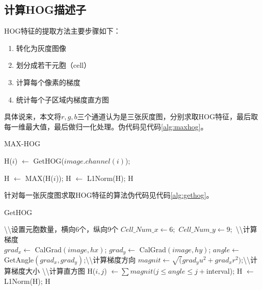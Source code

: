 \subsection{计算HOG描述子}
HOG特征的提取方法主要步骤如下：
\begin{enumerate}
  \item 转化为灰度图像
  \item 划分成若干元胞（cell）
  \item 计算每个像素的梯度
  \item 统计每个子区域内梯度直方图
\end{enumerate}

具体说来，本文将$r,g,b$三个通道认为是三张灰度图，分别求取HOG特征，最后取每一维最大值，最后做归一化处理。伪代码见代码\ref{alg:maxhog}。
\newcommand{\comment}{\textbackslash\textbackslash}
\begin{algorithm}
  \caption{MAX-HOG}\label{alg:maxhog}
  \begin{algorithmic}[1]

        \STATE H($i$) $\leftarrow$ GetHOG($image.channel(i)$);
    \ENDFOR

    \STATE  H $\leftarrow$ MAX(H($i$));
    \STATE  H $\leftarrow$ L1Norm(H);
    \RETURN H
  \end{algorithmic}
\end{algorithm}

针对每一张灰度图求取HOG特征的算法伪代码见代码\ref{alg:gethog}。

\begin{algorithm}
  \caption{GetHOG}\label{alg:gethog}
  \begin{algorithmic}[1]
    \STATE \comment 设置元胞数量，横向6个，纵向9个
    \STATE $Cell\_Num\_x \leftarrow 6;$
    \STATE $Cell\_Num\_y \leftarrow 9;$
    \STATE \comment 计算梯度\\
    \STATE $grad_x \leftarrow$ CalGrad$(image,hx)$;
    \STATE $grad_y \leftarrow$ CalGrad$(image,hy)$;
    \STATE $angle \leftarrow$ GetAngle$(grad_x,grad_y)$;\comment 计算梯度方向
    \STATE $magnit \leftarrow \sqrt(grad_yu^2+grad_xr^2)$;\comment 计算梯度大小
    \STATE \comment 计算直方图
            \STATE H($i,j$) $\leftarrow \sum magnit(j \leq angle \leq j+$interval);
        \ENDFOR
    \ENDFOR
    \STATE  H $\leftarrow$ L1Norm(H);
    \RETURN H
  \end{algorithmic}
\end{algorithm}

